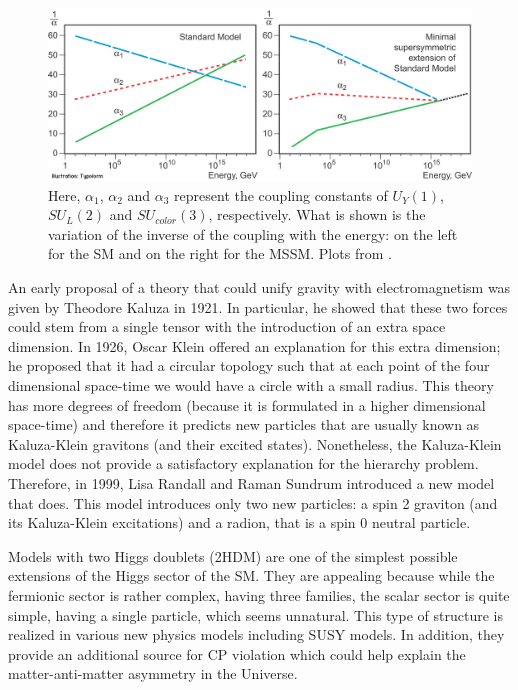 \begin{figure}
	\includegraphics[width=\textwidth]{Figures/SM_MSSM.jpg}
	\caption{Here, $\alpha_1$, $\alpha_2$ and $\alpha_3$ represent the coupling constants of $U_Y(1)$, $SU_L(2)$ and $SU_{color}(3)$, respectively. What is shown is the variation of the inverse of the coupling with the energy: on the left for the SM and on the right for the MSSM. Plots from \cite{running_coupling}.}
	\label{fig:SM_MSSM}
\end{figure}

An early proposal of a theory that could unify gravity with electromagnetism was given by Theodore Kaluza in 1921. In particular, he showed that these two forces could stem from a single tensor with the introduction of an extra space dimension. In 1926, Oscar Klein offered an explanation for this extra dimension; he proposed that it had a circular topology such that at each point of the four dimensional space-time we would have a circle with a small radius. This theory has more degrees of freedom (because it is formulated in a higher dimensional space-time) and therefore it predicts new particles that are usually known as Kaluza-Klein gravitons (and their excited states). Nonetheless, the Kaluza-Klein model does not provide a satisfactory explanation for the hierarchy problem. Therefore, in 1999, Lisa Randall and Raman Sundrum introduced a new model that does. This model introduces only two new particles: a spin 2 graviton (and its Kaluza-Klein excitations) and a radion, that is a spin 0 neutral particle.

Models with two Higgs doublets (2HDM) are one of the simplest possible extensions of the Higgs sector of the SM. They are appealing because while the fermionic sector is rather complex, having three families, the scalar sector is quite simple, having a single particle, which seems unnatural. This type of structure is realized in various new physics models including SUSY models. In addition, they provide an additional source for CP violation which could help explain the matter-anti-matter asymmetry in the Universe. 

